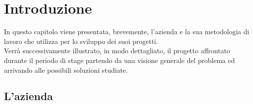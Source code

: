 
\chapter{Introduzione}
\label{cap:introduzione}
In questo capitolo viene presentata, brevemente, l'azienda e la sua metodologia di lavoro che utilizza per lo sviluppo dei suoi progetti.\\
Verrà successivamente illustrato, in modo dettagliato, il progetto affrontato durante il periodo di stage partendo da una visione generale del problema ed arrivando alle possibili soluzioni studiate.

\section{L'azienda}
